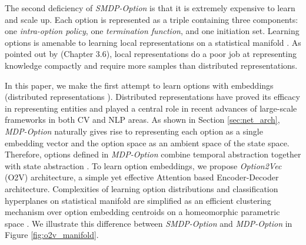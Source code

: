 \documentclass{article}
\begin{document}
The second deficiency of \emph{SMDP-Option} is that it is
extremely expensive to learn and scale up. Each option is
represented as a triple containing three components: one
\emph{intra-option policy}, one \emph{termination function}, and
one initiation set. Learning options is amenable to learning
local representations \cite{bacon2018temporal} on a statistical
manifold \cite{amari1987differential}. As pointed out by
 (Chapter 3.6), local representations
do a poor job at representing knowledge compactly and require
more samples than distributed representations.

In this paper, we make the first attempt to learn options with
embeddings (distributed representations
\cite{hinton1986learning}). Distributed representations have
proved its efficacy in representing entities and played a central
role in recent advances of large-scale frameworks in both CV
\cite{krizhevsky2012imagenet,dosovitskiy2020image} and NLP
\cite{vaswani2017attention,devlin2018bert,brown2020language}
areas. As shown in Section \ref{sec:net_arch}, \emph{MDP-Option}
naturally gives rise to representing each option as a single
embedding vector and the option space as an ambient space of the
state space. Therefore, options defined in \emph{MDP-Option}
combine temporal abstraction together with state abstraction
\cite{knoblock1990learning}. To learn option embeddings, we
propose \emph{Option2Vec} (O2V) architecture, a simple yet
effective Attention \cite{vaswani2017attention} based
Encoder-Decoder architecture. Complexities of learning option
distributions and classification hyperplanes on statistical
manifold are simplified as an efficient clustering mechanism over
option embedding centroids on a homeomorphic parametric space
\cite{amari1987differential}. We illustrate this difference
between \emph{SMDP-Option} and \emph{MDP-Option} in Figure
\ref{fig:o2v_manifold}.
\end{document}

